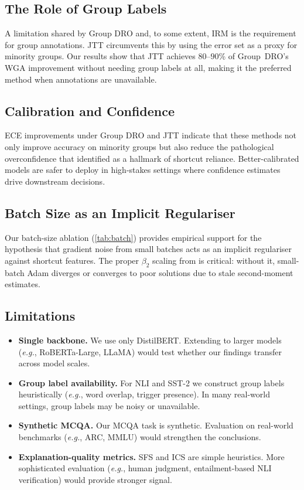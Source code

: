 \documentclass[10pt,twocolumn]{article}
\newcommand{\eg}{\emph{e.g.}\xspace}
\begin{document}
\subsection{The Role of Group Labels}

A limitation shared by Group DRO and, to some extent, IRM is
the requirement for group annotations.
JTT circumvents this by using the error set as a proxy for
minority groups.
Our results show that JTT achieves $80$--$90$\% of
Group~DRO's WGA improvement without needing group labels
at all, making it the preferred method when annotations are
unavailable.

\subsection{Calibration and Confidence}

ECE improvements under Group DRO and JTT indicate that these
methods not only improve accuracy on minority groups but also
reduce the pathological overconfidence that
\citet{yuan2024revisiting} identified as a hallmark of
shortcut reliance.
Better-calibrated models are safer to deploy in high-stakes
settings where confidence estimates drive downstream decisions.

\subsection{Batch Size as an Implicit Regulariser}

Our batch-size ablation (\cref{tab:batch}) provides
empirical support for the hypothesis that gradient noise from
small batches acts as an implicit regulariser against shortcut
features.
The proper $\beta_2$ scaling from \citet{marek2025scaling}
is critical: without it, small-batch Adam diverges or converges
to poor solutions due to stale second-moment estimates.

\subsection{Limitations}

\begin{itemize}[leftmargin=*,itemsep=2pt]
\item \textbf{Single backbone.}
  We use only DistilBERT.  Extending to larger models
  (\eg, RoBERTa-Large, LLaMA) would test whether our
  findings transfer across model scales.

\item \textbf{Group label availability.}
  For NLI and SST-2 we construct group labels heuristically
  (\eg, word overlap, trigger presence).  In many real-world
  settings, group labels may be noisy or unavailable.

\item \textbf{Synthetic MCQA.}
  Our MCQA task is synthetic.  Evaluation on real-world
  benchmarks (\eg, ARC, MMLU) would strengthen the conclusions.

\item \textbf{Explanation-quality metrics.}
  SFS and ICS are simple heuristics.  More sophisticated
  evaluation (\eg, human judgment, entailment-based NLI
  verification) would provide stronger signal.
\end{itemize}
\end{document}
